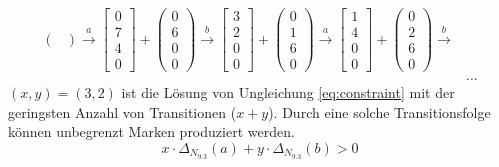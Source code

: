 \documentclass[a4paper]{scrartcl}
\begin{document}
\begin{enumerate}
\begin{itemize}
\begin{equation}
\begin{split}
\begin{pmatrix}
                        \end{pmatrix}
                        \stackrel{a}{\to}
                        \begin{bmatrix}
                            0 \\ 7 \\ 4 \\ 0
                        \end{bmatrix}
                        +
                        \begin{pmatrix}
                            0 \\ 6 \\ 0 \\ 0
                        \end{pmatrix}
                        \stackrel{b}{\to}
                        \begin{bmatrix}
                            3 \\ 2 \\ 0 \\ 0
                        \end{bmatrix}
                        +
                        \begin{pmatrix}
                            0 \\ 1 \\ 6 \\ 0
                        \end{pmatrix}
                        \stackrel{a}{\to}
                        \begin{bmatrix}
                            1 \\ 4 \\ 0 \\ 0
                        \end{bmatrix}
                        +
                        \begin{pmatrix}
                            0 \\ 2 \\ 6 \\ 0
                        \end{pmatrix}
                        \stackrel{b}{\to}
                        \\
                        &\dots
                    \end{split}
                \end{equation}
                $(x, y) = (3, 2)$ ist die Lösung von Ungleichung \ref{eq:constraint} mit
                der geringsten Anzahl von Transitionen ($x + y$).
                Durch eine solche Transitionsfolge können unbegrenzt Marken
                produziert werden.
                \begin{equation}
                    x \cdot \Delta_{N_{9.3}}(a) + y \cdot \Delta_{N_{9.3}}(b) > 0
                    \label{eq:constraint}
                \end{equation}
                

\end{itemize}
\end{enumerate}
\end{document}
